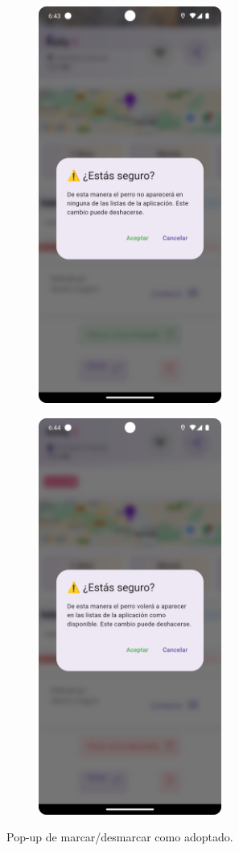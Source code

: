 \documentclass[a4paper, 12pt]{article}
\begin{document}
\begin{figure}[H]
   	\begin{subfigure}{0.48\textwidth}
		\begin{center}
			{\includegraphics[width=6cm]{app/AdoptedDialog.png}\par}
		\end{center}  
	\end{subfigure}\hfill
   	\begin{subfigure}{0.48\textwidth}
		\begin{center}
			{\includegraphics[width=6cm]{app/UnAdoptDog.png}\par}
		\end{center}  
	\end{subfigure}\hfill
	\caption{Pop-up de marcar/desmarcar como adoptado.}
\end{figure}
\end{document}
